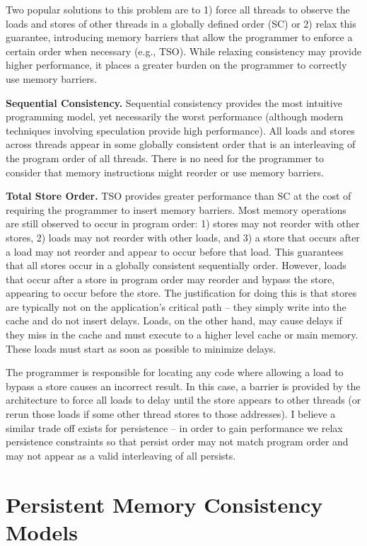 Two popular solutions to this problem are to 1) force all threads to observe the loads and stores of other threads in a globally defined order (SC) or 2) relax this guarantee, introducing memory barriers that allow the programmer to enforce a certain order when necessary (e.g., TSO).
While relaxing consistency may provide higher performance, it places a greater burden on the programmer to correctly use memory barriers.

\textbf{Sequential Consistency.}
Sequential consistency provides the most intuitive programming model, yet necessarily the worst performance (although modern techniques involving speculation provide high performance).
All loads and stores across threads appear in some globally consistent order that is an interleaving of the program order of all threads.
There is no need for the programmer to consider that memory instructions might reorder or use memory barriers.

\textbf{Total Store Order.}
TSO provides greater performance than SC at the cost of requiring the programmer to insert memory barriers.
Most memory operations are still observed to occur in program order: 1) stores may not reorder with other stores, 2) loads may not reorder with other loads, and 3) a store that occurs after a load may not reorder and appear to occur before that load.
This guarantees that all stores occur in a globally consistent sequentially order.
However, loads that occur after a store in program order may reorder and bypass the store, appearing to occur before the store.
The justification for doing this is that stores are typically not on the application's critical path -- they simply write into the cache and do not insert delays.
Loads, on the other hand, may cause delays if they miss in the cache and must execute to a higher level cache or main memory.
These loads must start as soon as possible to minimize delays.

The programmer is responsible for locating any code where allowing a load to bypass a store causes an incorrect result.
In this case, a barrier is provided by the architecture to force all loads to delay until the store appears to other threads (or rerun those loads if some other thread stores to those addresses).
I believe a similar trade off exists for persistence -- in order to gain performance we relax persistence constraints so that persist order may not match program order and may not appear as a valid interleaving of all persists.

\section{Persistent Memory Consistency Models}
\label{sec:PMC:PersistenceModels}

